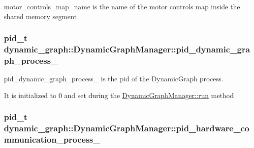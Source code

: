 motor\+\_\+controls\+\_\+map\+\_\+name is the name of the motor controls map inside the shared memory segment 

\subsubsection[{\texorpdfstring{pid\+\_\+dynamic\+\_\+graph\+\_\+process\+\_\+}{pid_dynamic_graph_process_}}]{\setlength{\rightskip}{0pt plus 5cm}pid\+\_\+t dynamic\+\_\+graph\+::\+Dynamic\+Graph\+Manager\+::pid\+\_\+dynamic\+\_\+graph\+\_\+process\+\_\+\hspace{0.3cm}{\ttfamily [protected]}}\hypertarget{classdynamic__graph_1_1DynamicGraphManager_aa8aa645099e7e9cce426381e38b5027d}{}\label{classdynamic__graph_1_1DynamicGraphManager_aa8aa645099e7e9cce426381e38b5027d}


pid\+\_\+dynamic\+\_\+graph\+\_\+process\+\_\+ is the pid of the Dynamic\+Graph process. 

It is initialized to 0 and set during the \hyperlink{classdynamic__graph_1_1DynamicGraphManager_a93272fcbb3793dfc92422186022ecf72}{Dynamic\+Graph\+Manager\+::run} method 
\subsubsection[{\texorpdfstring{pid\+\_\+hardware\+\_\+communication\+\_\+process\+\_\+}{pid_hardware_communication_process_}}]{\setlength{\rightskip}{0pt plus 5cm}pid\+\_\+t dynamic\+\_\+graph\+::\+Dynamic\+Graph\+Manager\+::pid\+\_\+hardware\+\_\+communication\+\_\+process\+\_\+\hspace{0.3cm}{\ttfamily [protected]}}\hypertarget{classdynamic__graph_1_1DynamicGraphManager_a02232cdc5cabca34d07dada6ced38532}{}\label{classdynamic__graph_1_1DynamicGraphManager_a02232cdc5cabca34d07dada6ced38532}


